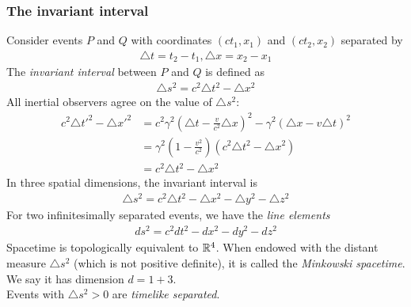 \documentclass[a4paper]{article}
\begin{document}
\subsubsection{The invariant interval}
Consider events $P$ and $Q$ with coordinates $\left(ct_1,x_1\right)$ and $\left(ct_2,x_2\right)$ separated by
\begin{equation*}
\begin{aligned}
\triangle t = t_2 - t_1, \triangle x = x_2 - x_1
\end{aligned}
\end{equation*}
The \emph{invariant interval} between $P$ and $Q$ is defined as
\begin{equation*}
\begin{aligned}
\triangle s^2 = c^2 \triangle t^2 - \triangle x^2
\end{aligned}
\end{equation*}
All inertial observers agree on the value of $\triangle s^2$:
\begin{equation*}
\begin{aligned}
c^2 \triangle t'^2 -\triangle x'^2 &= c^2 \gamma^2 \left(\triangle t-\frac{v}{c^2}\triangle x\right)^2 - \gamma^2 \left(\triangle x-v\triangle t\right)^2\\
&= \gamma^2 \left(1-\frac{v^2}{c^2}\right)\left(c^2\triangle t^2 - \triangle x^2\right)\\
&= c^2 \triangle t^2 - \triangle x^2
\end{aligned}
\end{equation*}
In three spatial dimensions, the invariant interval is
\begin{equation*}
\begin{aligned}
\triangle s^2 = c^2 \triangle t^2 - \triangle x^2 - \triangle y^2 - \triangle z^2
\end{aligned}
\end{equation*}
For two infinitesimally separated events, we have the \emph{line elements}
\begin{equation*}
\begin{aligned}
ds^2 = c^2dt^2 - dx^2 - dy^2 - dz^2
\end{aligned}
\end{equation*}
Spacetime is topologically equivalent to $\mathbb{R}^4$. When endowed with the distant measure $\triangle s^2$ (which is not positive definite), it is called the \emph{Minkowski spacetime}.\\
We say it has dimension $d=1+3$.\\
Events with $\triangle s^2 > 0$ are \emph{timelike separated}.\\
\end{document}
